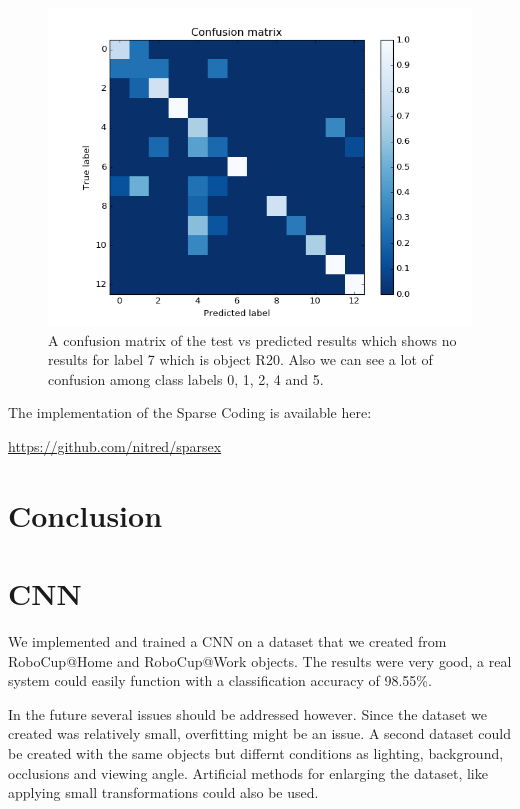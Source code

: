\documentclass[	DIV=calc,%
				paper=a4,%
				fontsize=11pt,%
				twocolumn]{scrartcl}	 %
\begin{document}
\begin{figure}[H]
    \centering
    \includegraphics[width=0.9\linewidth]{data/sc_data/sc_atwork_confusion_matrix.png}
    \caption{A confusion matrix of the test vs predicted results which shows no results for label 7 which is object R20. Also we can see a lot of confusion among class labels 0, 1, 2, 4 and 5.}
    \label{sc_atwork_confusion_matrix}
\end{figure}


The implementation of the Sparse Coding is available here: \begin{small}\url{https://github.com/nitred/sparsex}\end{small}


\section{Conclusion}

\section*{CNN}
We implemented and trained a CNN on a dataset that we created from RoboCup@Home and RoboCup@Work objects. The results were very good, a real system could easily function with a classification accuracy of 98.55\%. 

In the future several issues should be addressed however. Since the dataset we created was relatively small, overfitting might be an issue. A second dataset could be created with the same objects but differnt conditions as lighting, background, occlusions and viewing angle. Artificial methods for enlarging the dataset, like applying small transformations could also be used.
\end{document}
